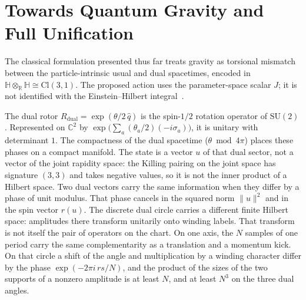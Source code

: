\documentclass[a4paper]{article}
\begin{document}
\section{Towards Quantum Gravity and Full Unification}
\label{sec:quantumgravity}

The classical formulation presented thus far treats gravity as torsional mismatch between the particle-intrinsic usual and dual spacetimes, encoded in $\mathbb{H}\otimes_{\mathbb{R}}\mathbb{H}\cong\mathrm{Cl}(3,1)$. The proposed action uses the parameter-space scalar $J$; it is not identified with the Einstein--Hilbert integral~\cite{hilbert1915}.

The dual rotor $R_\text{dual}=\exp(\theta/2\,\hat q)$ is the spin-$1/2$ rotation operator of $\mathrm{SU}(2)$. Represented on $\mathbb{C}^2$ by $\exp\bigl(\sum_a(\theta_a/2)(-i\sigma_a)\bigr)$, it is unitary with determinant $1$. The compactness of the dual spacetime ($\theta\bmod 4\pi$) places these phases on a compact manifold. The state is a vector $u$ of that dual sector, not a vector of the joint rapidity space: the Killing pairing on the joint space has signature $(3,3)$ and takes negative values, so it is not the inner product of a Hilbert space. Two dual vectors carry the same information when they differ by a phase of unit modulus. That phase cancels in the squared norm $\lVert u\rVert^2$ and in the spin vector $r(u)$. The discrete dual circle carries a different finite Hilbert space: amplitudes there transform unitarily onto winding labels. That transform is not itself the pair of operators on the chart. On one axis, the \(N\) samples of one period carry the same complementarity as a translation and a momentum kick. On that circle a shift of the angle and multiplication by a winding character differ by the phase $\exp(-2\pi i\, rs/N)$, and the product of the sizes of the two supports of a nonzero amplitude is at least $N$, and at least $N^3$ on the three dual angles.
\end{document}
